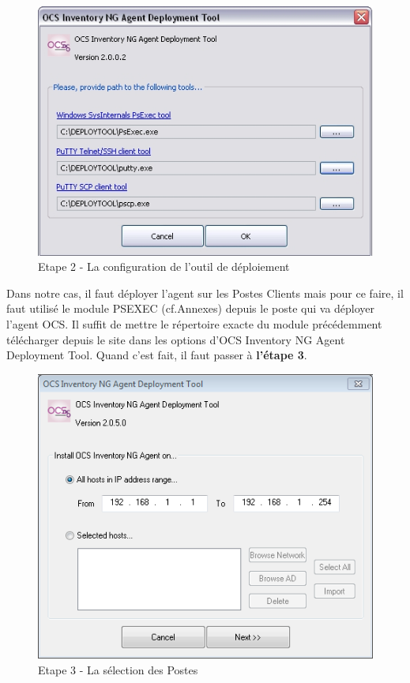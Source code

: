 \documentclass[11pt,a4paper,oneside]{article}
\begin{document}
\begin{figure}[hbtp]
  \centering
  \includegraphics[scale=0.5]{Script/2.jpg}
  \caption{Etape 2 - La configuration de l'outil de déploiement}
\end{figure} 
Dans notre cas, il faut déployer l'agent sur les Postes Clients mais pour ce faire, il faut utilisé le module PSEXEC (cf.Annexes) depuis le poste qui va déployer l'agent OCS. Il suffit de mettre le répertoire exacte du module précédemment télécharger depuis le site dans les options d'OCS Inventory NG Agent Deployment Tool. Quand c'est fait, il faut passer à \textbf{l'étape 3}. \\

\begin{figure}[hbtp]
 \centering
 \includegraphics[scale=0.7]{Script/3.png}
 \caption{Etape 3 - La sélection des Postes}
 \end{figure}
  
\end{document}
